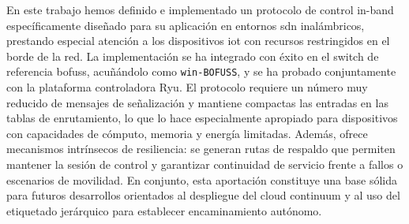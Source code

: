 En este trabajo hemos definido e implementado un protocolo de control in-band específicamente diseñado para su aplicación en entornos \gls{sdn} inalámbricos, prestando especial atención a los dispositivos \gls{iot} con recursos restringidos en el borde de la red. La implementación se ha integrado con éxito en el switch de referencia \gls{bofuss}, acuñándolo como \texttt{win-BOFUSS}, y se ha probado conjuntamente con la plataforma controladora Ryu. El protocolo requiere un número muy reducido de mensajes de señalización y mantiene compactas las entradas en las tablas de enrutamiento, lo que lo hace especialmente apropiado para dispositivos con capacidades de cómputo, memoria y energía limitadas. Además, ofrece mecanismos intrínsecos de resiliencia: se generan rutas de respaldo que permiten mantener la sesión de control y garantizar continuidad de servicio frente a fallos o escenarios de movilidad. En conjunto, esta aportación constituye una base sólida para futuros desarrollos orientados al despliegue del cloud continuum y al uso del etiquetado jerárquico para establecer encaminamiento autónomo.